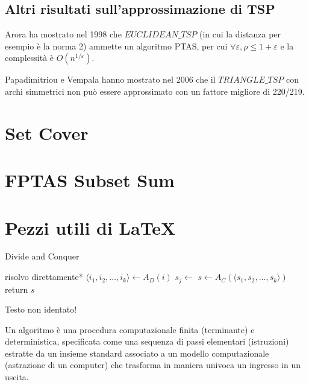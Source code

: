 \subsection{Altri risultati sull'approssimazione di TSP}

Arora ha mostrato nel 1998 \cite{Arora:1998:PTA:290179.290180} che $EUCLIDEAN\_TSP$ (in cui la distanza per esempio è la norma 2) ammette un algoritmo PTAS,
per cui
$
\forall \varepsilon,
\rho \leq 1+\varepsilon
$
e la complessità è $
O \left( n^{1/\varepsilon} \right)
$.

Papadimitriou e Vempala hanno mostrato nel 2006 \cite{Papadimitriou:2006:s00493-006-0008-z} che il $TRIANGLE\_TSP$ con archi simmetrici non può essere approssimato con un fattore migliore di 220/219.

\section{Set Cover}

\section{FPTAS Subset Sum}

\section{Pezzi utili di \LaTeX{}}
\begin{algorithm}[H]
\caption{Divide and Conquer}\label{alg:dnc}
\begin{algorithmic}[1]
            \State *risolvo direttamente*
        \EndIf
        \State $\langle i_1, i_2, \dots, i_k \rangle \gets A_D(i)$ 
            \State $s_j \gets $ 
        \EndFor
        \State $s \gets A_C(\langle s_1, s_2, \dots, s_k \rangle)$
        \State return $s$
    \EndProcedure
\end{algorithmic}
\end{algorithm}
\noindent
Testo non identato!

\begin{definition}[Algoritmo]\label{def:algex}
    Un algoritmo è una procedura computazionale finita (terminante) e deterministica, specificata come una sequenza di passi elementari (istruzioni) estratte da un insieme standard associato a un modello computazionale (astrazione di un computer) che trasforma in maniera univoca un ingresso in un uscita.
\end{definition}

